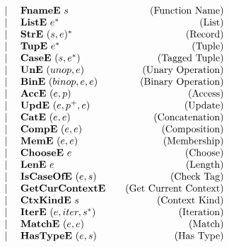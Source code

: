 {\begin{align*}
\begin{array}{lcccrlr}
    &&&& | & ~ \textbf{FnameE} ~ s &\quad\text{(Function Name)} \\
    &&&& | & ~ \textbf{ListE} ~ e^* &\quad\text{(List)} \\
    &&&& | & ~ \textbf{StrE} ~ (s, e)^* &\quad\text{(Record)} \\
    &&&& | & ~ \textbf{TupE} ~ e^* &\quad\text{(Tuple)} \\
    &&&& | & ~ \textbf{CaseE} ~ (s, e^*) &\quad\text{(Tagged Tuple)} \\
    &&&& | & ~ \textbf{UnE} ~ (unop, e) &\quad\text{(Unary Operation)} \\
    &&&& | & ~ \textbf{BinE} ~ (binop, e, e) &\quad\text{(Binary Operation)} \\
    &&&& | & ~ \textbf{AccE} ~ (e, p) &\quad\text{(Access)} \\
    &&&& | & ~ \textbf{UpdE} ~ (e, p^+, e) &\quad\text{(Update)} \\
    &&&& | & ~ \textbf{CatE} ~ (e, e) &\quad\text{(Concatenation)} \\
    &&&& | & ~ \textbf{CompE} ~ (e, e) &\quad\text{(Composition)} \\
    &&&& | & ~ \textbf{MemE} ~ (e, e) &\quad\text{(Membership)} \\
    &&&& | & ~ \textbf{ChooseE} ~ e &\quad\text{(Choose)} \\
    &&&& | & ~ \textbf{LenE} ~ e &\quad\text{(Length)} \\
    &&&& | & ~ \textbf{IsCaseOfE} ~ (e, s) &\quad\text{(Check Tag)} \\
    &&&& | & ~ \textbf{GetCurContextE}  &\quad\text{(Get Current Context)} \\
    &&&& | & ~ \textbf{CtxKindE} ~ s &\quad\text{(Context Kind)} \\
    &&&& | & ~ \textbf{IterE} ~ (e, iter, s^*) &\quad\text{(Iteration)} \\
    &&&& | & ~ \textbf{MatchE} ~ (e, e) &\quad\text{(Match)} \\
    &&&& | & ~ \textbf{HasTypeE} ~ (e, s) &\quad\text{(Has Type)} \\
\end{array}
\end{align*}
}

